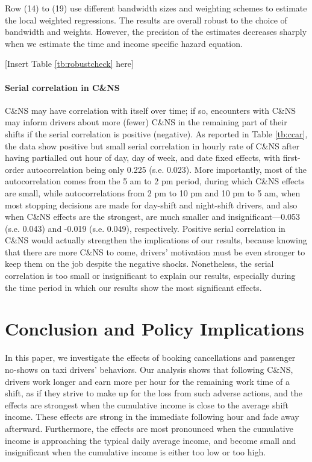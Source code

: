 \documentclass[reviewmode,AEJ]{AEA}
\begin{document}
Row (14) to (19) use different bandwidth sizes and weighting schemes to estimate the local weighted regressions. The results are overall robust to the choice of bandwidth and weights. However, the precision of the estimates decreases sharply when we estimate the time and income specific hazard equation.

\begin{center}
	[Insert Table \ref{tb:robustcheck} here]
\end{center}

\paragraph{Serial correlation in C\&NS} C\&NS may have correlation with itself over time; if so, encounters
with C\&NS may inform drivers about more (fewer) C\&NS in the remaining part of their shifts if the serial 
correlation is positive (negative). As reported in Table \ref{tb:ccar}, the data show positive but small 
serial correlation in hourly rate of C\&NS after having partialled out hour of day, day of week, and date 
fixed effects, with first-order autocorrelation being only 0.225 (s.e. 0.023). More importantly, most of 
the autocorrelation comes from the 5 am to 2 pm period, during which C\&NS effects are small, while 
autocorrelations from 2 pm to 10 pm and 10 pm to 5 am, when most stopping decisions are made for day-shift
and night-shift drivers, and also when C\&NS effects are the strongest, are much smaller and insignificant---0.053
(s.e. 0.043) and -0.019 (s.e. 0.049), respectively. Positive serial correlation in C\&NS would actually strengthen
the implications of our results, because knowing that there are more C\&NS to come, drivers' motivation must 
be even stronger to keep them on the job despite the negative shocks. Nonetheless, the serial correlation is
too small or insignificant to explain our results, especially during the time period in which our results 
show the most significant effects.

\section{Conclusion and Policy Implications}
\label{sec:conclude}
In this paper, we investigate the effects of booking cancellations and passenger no-shows on taxi 
drivers' behaviors. Our analysis shows that following C\&NS, drivers work longer and earn more per hour
for the remaining work time of a shift, as if they strive to make up for the loss from such adverse actions, and the effects are strongest when the cumulative income is close to the average shift income. 
These effects are strong in the immediate following hour and fade away afterward. Furthermore, the effects are most pronounced when the cumulative income is approaching the typical daily average income, and become small and insignificant when the cumulative income is either too low or too high.
\end{document}
